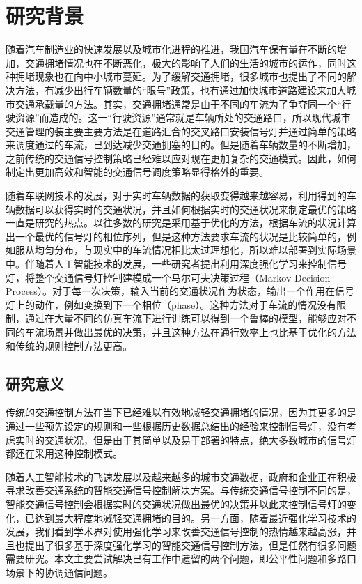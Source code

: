 
\chapter{研究背景}
随着汽车制造业的快速发展以及城市化进程的推进，我国汽车保有量在不断的增加，交通拥堵情况也在不断恶化，极大的影响了人们的生活的城市的运作，同时这种拥堵现象也在向中小城市蔓延。为了缓解交通拥堵，很多城市也提出了不同的解决方法，有减少出行车辆数量的“限号”政策，也有通过加快城市道路建设来加大城市交通承载量的方法。其实，交通拥堵通常是由于不同的车流为了争夺同一个“行驶资源”而造成的。这一“行驶资源”通常就是车辆所处的交通路口，所以现代城市交通管理的装主要主要方法是在道路汇合的交叉路口安装信号灯并通过简单的策略来调度通过的车流，已到达减少交通拥塞的目的。但是随着车辆数量的不断增加，之前传统的交通信号控制策略已经难以应对现在更加复杂的交通模式。因此，如何制定出更加高效和智能的交通信号调度策略显得格外的重要。

随着车联网技术的发展，对于实时车辆数据的获取变得越来越容易，利用得到的车辆数据可以获得实时的交通状况，并且如何根据实时的交通状况来制定最优的策略一直是研究的热点。以往多数的研究是采用基于优化的方法，根据车流的状况计算出一个最优的信号灯的相位序列，但是这种方法要求车流的状况是比较简单的，例如服从均匀分布，与现实中的车流情况相比太过理想化，所以难以部署到实际场景中。伴随着人工智能技术的发展，一些研究者提出利用深度强化学习来控制信号灯，将整个交通信号灯控制建模成一个马尔可夫决策过程（Markov Decision Process）。对于每一次决策，输入当前的交通状况作为状态，输出一个作用在信号灯上的动作，例如变换到下一个相位（phase）。这种方法对于车流的情况没有限制，通过在大量不同的仿真车流下进行训练可以得到一个鲁棒的模型，能够应对不同的车流场景并做出最优的决策，并且这种方法在通行效率上也比基于优化的方法和传统的规则控制方法更高。


\section{研究意义}
传统的交通控制方法在当下已经难以有效地减轻交通拥堵的情况，因为其更多的是通过一些预先设定的规则和一些根据历史数据总结出的经验来控制信号灯，没有考虑实时的交通状况，但是由于其简单以及易于部署的特点，绝大多数城市的信号灯都还在采用这种控制模式。

随着人工智能技术的飞速发展以及越来越多的城市交通数据，政府和企业正在积极寻求改善交通系统的智能交通信号控制解决方案。与传统交通信号控制不同的是，智能交通信号控制会根据实时的交通状况做出最优的决策并以此来控制信号灯的变化，已达到最大程度地减轻交通拥堵的目的。另一方面，随着最近强化学习技术的发展，我们看到学术界对使用强化学习来改善交通信号控制的热情越来越高涨，并且也提出了很多基于深度强化学习的智能交通信号控制方法，但是任然有很多问题需要研究。本文主要尝试解决已有工作中遗留的两个问题，即公平性问题和多路口场景下的协调通信问题。

